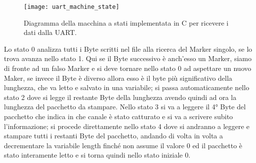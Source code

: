 \begin{figure}[H]
\texttt{[image: uart\_machine\_state]}
\centering
\caption{Diagramma della macchina a stati implementata in C per ricevere i dati dalla UART.}
\label{uart_machine_state}
\end{figure}

Lo stato 0 analizza tutti i Byte scritti nel file alla ricerca del Marker singolo, se lo trova avanza nello stato 1. Qui se il Byte successivo è anch'esso un Marker, siamo di fronte ad un falso Marker e si deve tornare nello stato 0 ad aspettare un nuovo Maker, se invece il Byte è diverso allora esso è il byte più significativo della lunghezza, che va letto e salvato in una variabile; si passa automaticamente nello stato 2 dove si legge il restante Byte della lunghezza avendo quindi ad ora la lunghezza del pacchetto da stampare. Nello stato 3 si va a leggere il 4° Byte del pacchetto che indica in che canale è stato catturato e si va a scrivere subito l'informazione; si procede direttamente nello stato 4 dove si andranno a leggere e stampare tutti i restanti Byte del pacchetto, andando di volta in volta a decrementare la variabile length finché non assume il valore 0 ed il pacchetto è stato interamente letto e si torna quindi nello stato iniziale 0.

